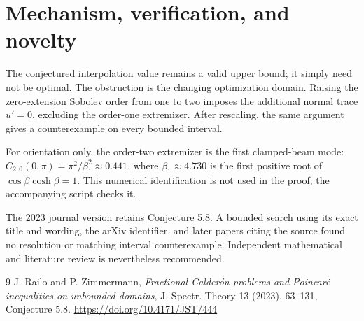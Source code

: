 \documentclass[11pt]{article}
\begin{document}
\section{Mechanism, verification, and novelty}

The conjectured interpolation value remains a valid upper bound; it simply need
not be optimal.  The obstruction is the changing optimization domain.  Raising
the zero-extension Sobolev order from one to two imposes the additional normal
trace $u'=0$, excluding the order-one extremizer.  After rescaling, the same
argument gives a counterexample on every bounded interval.

For orientation only, the order-two extremizer is the first clamped-beam mode:
$C_{2,0}(0,\pi)=\pi^2/\beta_1^2\approx0.441$, where $\beta_1\approx4.730$ is
the first positive root of $\cos\beta\cosh\beta=1$.  This numerical
identification is not used in the proof; the accompanying script checks it.

The 2023 journal version retains Conjecture 5.8.  A bounded search using its
exact title and wording, the arXiv identifier, and later papers citing the
source found no resolution or matching interval counterexample.  Independent
mathematical and literature review is nevertheless recommended.

\begin{thebibliography}{9}
J. Railo and P. Zimmermann,
\emph{Fractional Calder\'on problems and Poincar\'e inequalities on unbounded
domains}, J. Spectr. Theory 13 (2023), 63--131, Conjecture 5.8.
\url{https://doi.org/10.4171/JST/444}
\end{thebibliography}
\end{document}
